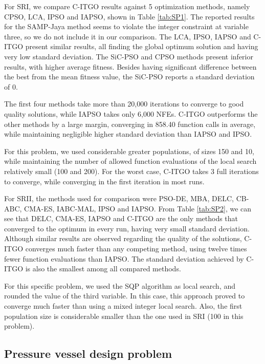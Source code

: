 For SRI, we compare C-ITGO results against 5 optimization methods, namely CPSO, LCA, IPSO and IAPSO, shown in Table \ref{tab:SP1}. The reported results for the SAMP-Jaya method seems to violate the integer constraint at variable three, so we do not include it in our comparison. The LCA, IPSO, IAPSO and C-ITGO present similar results, all finding the global optimum solution and having very low standard deviation. The SiC-PSO and CPSO methods present inferior results, with higher average fitness. Besides having significant difference between the best from the mean fitness value, the SiC-PSO reports a standard deviation of 0.



The first four methods take more than 20,000 iterations to converge to good quality solutions, while IAPSO takes only 6,000 NFEs. C-ITGO outperforms the other methods by a large margin, converging in 858.40 function calls in average, while maintaining negligible higher standard deviation than IAPSO and IPSO.

For this problem, we used considerable greater populations, of sizes 150 and 10, while maintaining the number of allowed function evaluations of the local search relatively small (100 and 200). For the worst case, C-ITGO takes 3 full iterations to converge, while converging in the first iteration in most runs.

For SRII, the methods used for comparison were PSO-DE, MBA, DELC, CB-ABC, CMA-ES, IABC-MAL, IPSO and IAPSO. From Table \ref{tab:SP2}, we can see that DELC, CMA-ES, IAPSO and C-ITGO are the only methods that converged to the optimum in every run, having very small standard deviation. Although similar results are observed regarding the quality of the solutions, C-ITGO converges much faster than any competing method, using twelve times fewer function evaluations than IAPSO. The standard deviation achieved by C-ITGO is also the smallest among all compared methods.



For this specific problem, we used the SQP algorithm as local search, and rounded the value of the third variable. In this case, this approach proved to converge much faster than using a mixed integer local search. Also, the first population size is considerable smaller than the one used in SRI (100 in this problem).



\subsection{Pressure vessel design problem}

